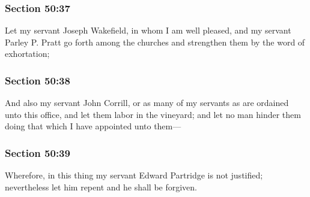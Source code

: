 	\subsubsection{Section 50:37} %
		\label{DC50-37}

		Let my servant Joseph Wakefield, in whom I am well pleased, and my servant Parley P. Pratt go forth among the churches and strengthen them by the word of exhortation;


	\subsubsection{Section 50:38} %
		\label{DC50-38}

		And also my servant John Corrill, or as many of my servants as are ordained unto this office, and let them labor in the vineyard; and let no man hinder them doing that which I have appointed unto them---


	\subsubsection{Section 50:39} %
		\label{DC50-39}

		Wherefore, in this thing my servant Edward Partridge is not justified; nevertheless let him repent and he shall be forgiven.


